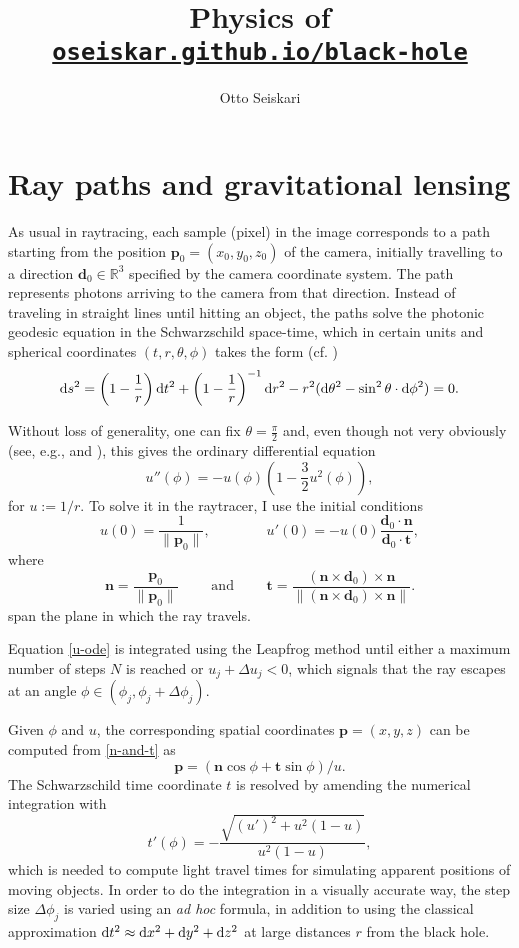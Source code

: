 \documentclass[a4paper,12pt]{article}
\title{Physics of \href{https://oseiskar.github.io/black-hole}{\tt oseiskar.github.io/black-hole}}
\author{Otto Seiskari}
\date{}
\def\mb{\boldsymbol}
\def\d{{\rm d}}
\begin{document}
\maketitle

\section*{Ray paths and gravitational lensing}

As usual in raytracing, each sample (pixel) in the image corresponds to a path starting from the position $\mb p_0 = (x_0, y_0, z_0)$ of the camera, initially travelling to a direction $\mb d_0 \in \mathbb R^3$ specified by the camera coordinate system. The path represents photons arriving to the camera from that direction. 
Instead of traveling in straight lines until hitting an object, the paths solve the photonic geodesic equation in the Schwarzschild space-time, which in certain units and spherical coordinates $(t,r,\theta,\phi)$ takes the form (cf. \cite[\S 4.2.1]{astro-princeton})
$$
%
    \d s^2 = \left(1-\frac1r\right)\d t^2 + \left(1-\frac1r\right)^{-1} \d r^2 - r^2(\d \theta^2-\sin^2\theta \cdot \d \phi^2) = 0.
$$

Without loss of generality, one can fix $\theta = \frac\pi2$ and, even though not very obviously (see, e.g., \cite{wikipedia:sch} and \cite{antonell}), this gives the ordinary differential equation
\begin{equation}\label{u-ode}
    u''(\phi) = -u(\phi) \left(1-\frac32u^2(\phi)\right),
\end{equation}
for $u := 1/r$.
To solve it in the raytracer, I use the initial conditions
\def\n{\mb n}
\def\p{\mb p_0}
\def\v{\mb v}
\def\t{\mb t}
\def\bd{\mb d_0}
$$
%
    u(0) = \frac1{\|\p\|}, \qquad \qquad
    u'(0) = -u(0) \frac{\bd \cdot \n}{\bd \cdot \t},
$$
where
\begin{equation}\label{n-and-t}
    \n = \frac{\p}{\|\p\|}
    \qquad \mbox{ and } \qquad
    \t = \frac{(\n \times \bd) \times \n}{\|(\n \times \bd) \times \n\|}.
\end{equation}
span the plane in which the ray travels.

Equation \eqref{u-ode} is integrated using the Leapfrog method until either a maximum number of steps $N$ is reached or $u_j + \Delta u_j < 0$, which signals that the ray escapes at an angle $\phi \in (\phi_j, \phi_j + \Delta \phi_j)$.

Given $\phi$ and $u$, the corresponding spatial coordinates $\mb p = (x,y,z)$ can be computed from \eqref{n-and-t} as
$$
  \mb p = \left( \n \cos \phi  + \t \sin \phi\right) / u.
$$
The Schwarzschild time coordinate $t$ is resolved by amending the numerical integration with
$$
 t'(\phi) = -\frac{\sqrt{(u')^2 + u^2(1-u)}}{u^2(1-u)},
$$
which is needed to compute light travel times for simulating apparent positions of moving objects.
In order to do the integration in a visually accurate way, the step size $\Delta \phi_j$ is varied using an \emph{ad hoc} formula, %
in addition to using the classical approximation $\d t^2 \approx \d x^2 + \d y^2 + \d z^2$ at large distances $r$ from the black hole.
\end{document}
